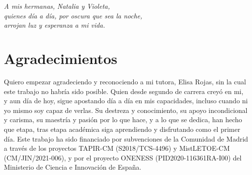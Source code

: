

\cleardoublepage %
\chapter*{}
\setlength{\leftmargin}{0.5\textwidth}
\setlength{\parsep}{0cm}
\addtolength{\topsep}{0.5cm}
\begin{flushright}
	\small\em{
		A mis hermanas, Natalia y Violeta,\\
		quienes día a día, por oscura que sea la noche,\\
		arrojan luz y esperanza a mi vida.
	}
\end{flushright}




\chapter*{Agradecimientos}

\thispagestyle{empty}
\vspace{1cm}

Quiero empezar agradeciendo y reconociendo a mi tutora, Elisa Rojas, sin la cual este trabajo no habría sido posible. Quien desde segundo de carrera creyó en mi, y aun día de hoy, sigue apostando día a día en mis capacidades, incluso cuando ni yo mismo soy capaz de verlas. Su destreza y conocimiento, su apoyo incondicional y carisma, su maestría y pasión por lo que hace, y a lo que se dedica, han hecho que etapa, tras etapa académica siga aprendiendo y disfrutando como el primer día. Este trabajo ha sido financiado por subvenciones de la Comunidad de Madrid a través de los proyectos TAPIR-CM (S2018/TCS-4496) y MistLETOE-CM (CM/JIN/2021-006), y por el proyecto ONENESS (PID2020-116361RA-I00) del Ministerio de Ciencia e Innovación de España.\newline


